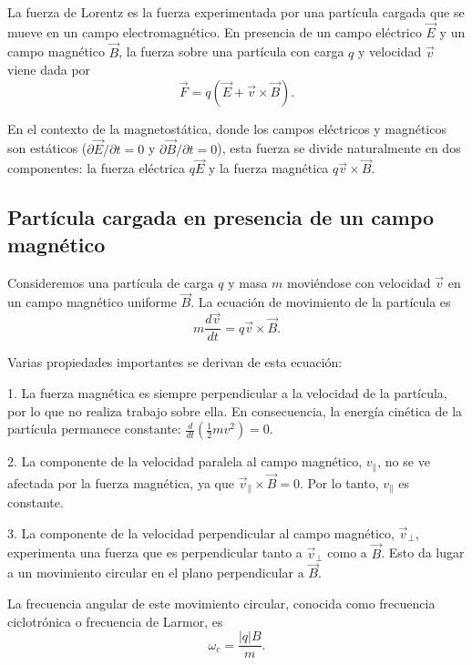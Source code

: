 \documentclass[12pt,a4paper]{book}
\begin{document}
La fuerza de Lorentz es la fuerza experimentada por una partícula cargada que se mueve en un campo electromagnético. En presencia de un campo eléctrico $\vec{E}$ y un campo magnético $\vec{B}$, la fuerza sobre una partícula con carga $q$ y velocidad $\vec{v}$ viene dada por
\begin{equation}
\vec{F} = q(\vec{E} + \vec{v} \times \vec{B}).
\end{equation}

En el contexto de la magnetostática, donde los campos eléctricos y magnéticos son estáticos ($\partial \vec{E}/\partial t = 0$ y $\partial \vec{B}/\partial t = 0$), esta fuerza se divide naturalmente en dos componentes: la fuerza eléctrica $q\vec{E}$ y la fuerza magnética $q\vec{v} \times \vec{B}$.

\subsection{Partícula cargada en presencia de un campo magnético}

Consideremos una partícula de carga $q$ y masa $m$ moviéndose con velocidad $\vec{v}$ en un campo magnético uniforme $\vec{B}$. La ecuación de movimiento de la partícula es
\begin{equation}
m\frac{d\vec{v}}{dt} = q\vec{v} \times \vec{B}.
\end{equation}

Varias propiedades importantes se derivan de esta ecuación:

1. La fuerza magnética es siempre perpendicular a la velocidad de la partícula, por lo que no realiza trabajo sobre ella. En consecuencia, la energía cinética de la partícula permanece constante: $\frac{d}{dt}(\frac{1}{2}mv^2) = 0$.

2. La componente de la velocidad paralela al campo magnético, $v_{\parallel}$, no se ve afectada por la fuerza magnética, ya que $\vec{v}_{\parallel} \times \vec{B} = 0$. Por lo tanto, $v_{\parallel}$ es constante.

3. La componente de la velocidad perpendicular al campo magnético, $\vec{v}_{\perp}$, experimenta una fuerza que es perpendicular tanto a $\vec{v}_{\perp}$ como a $\vec{B}$. Esto da lugar a un movimiento circular en el plano perpendicular a $\vec{B}$.

La frecuencia angular de este movimiento circular, conocida como frecuencia ciclotrónica o frecuencia de Larmor, es
\begin{equation}
\omega_c = \frac{|q|B}{m}.
\end{equation}
\end{document}
